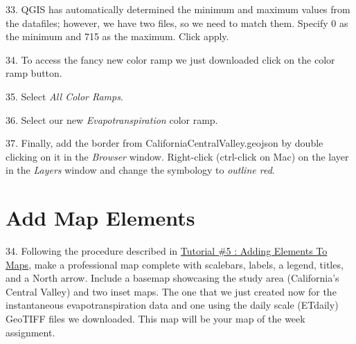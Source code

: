 \documentclass[oneside,a4paper,11pt,explicit]{book}
\begin{document}
33. QGIS has automatically determined the minimum and maximum values from the datafiles; however, we have two files, so we need to match them. Specify 0 as the minimum and 715 as the maximum. Click apply.

34. To access the fancy new color ramp we just downloaded click on the color ramp button.

35. Select \textit{All Color Ramps}.

36. Select our new \textit{Evapotranspiration} color ramp. 

37. Finally, add the border from CaliforniaCentralValley.geojson by double clicking on it in the \textit{Browser} window. Right-click (ctrl-click on Mac) on the layer in the \textit{Layers} window and change the symbology to \textit{outline red}. 


\section{Add Map Elements}

34. Following the procedure described in \href{https://jeremydforsythe.github.io/icecream-tutorials/Tutorial5_AddingElementsToMaps/Tutorial5_AddingElementsToMaps.pdf}{Tutorial \#5 : Adding Elements To Maps}, make a professional map complete with scalebars, labels, a legend, titles, and a North arrow. Include a basemap showcasing the study area (California's Central Valley) and two inset maps. The one that we just created now for the instantaneous evapotranspiration data and one using the daily scale (ETdaily) GeoTIFF files we downloaded. This map will be your map of the week assignment.
\end{document}
